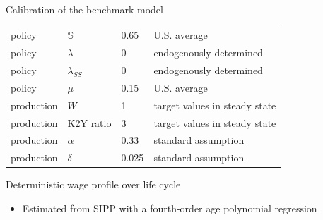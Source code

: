 \documentclass{beamer}
\begin{document}
\begin{frame}{Calibration of the benchmark model}
\begin{table}[p]
\begin{adjustbox}{width={0.8\textwidth}}
\begin{tabular}{llll}
				policy            & $\mathbb{S}$                & 0.65   & U.S. average                         \\
				policy            & $\lambda$                   & 0      & endogenously determined              \\
				policy            & $\lambda_{SS}$              & 0      & endogenously determined              \\
				policy            & $\mu$                       & 0.15   & U.S. average                         \\
				\hline 
				production        & $W$                         & 1      & target values in steady state        \\
				production        & K2Y ratio                   & 3      & target values in steady state        \\
				production        & $\alpha$                    & 0.33   & standard assumption                  \\
				production        & $\delta$                    & 0.025  & standard assumption          \\
				\hline 
			\end{tabular} 
		\end{adjustbox}
	\end{table}
	\hyperlink{StE_dist_compare}{} 
\end{frame}

\begin{frame}{Deterministic wage profile over life cycle}
	\begin{figure}[!ht]
	\begin{center}
	\end{center}
\end{figure}
\begin{itemize}
\item 	{\scriptsize Estimated from SIPP with a fourth-order age polynomial regression}
\end{itemize}

\end{frame}
\end{document}
